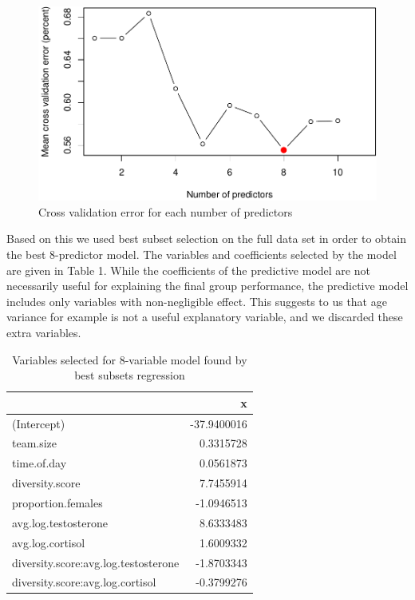 \documentclass[]{article}
\begin{document}
\begin{figure}
\centering
\includegraphics{19_10_27_hw7_q1_files/figure-latex/cv-1.pdf}
\caption{\label{fig:cv} Cross validation error for each number of
predictors}
\end{figure}

Based on this we used best subset selection on the full data set in
order to obtain the best 8-predictor model. The variables and
coefficients selected by the model are given in Table 1. While the
coefficients of the predictive model are not necessarily useful for
explaining the final group performance, the predictive model includes
only variables with non-negligible effect. This suggests to us that age
variance for example is not a useful explanatory variable, and we
discarded these extra variables.

\begin{table}

\caption{\label{tab:unnamed-chunk-2}Variables selected for 8-variable model found by best subsets regression}
\centering
\begin{tabular}[t]{l|r}
\hline
  & x\\
\hline
(Intercept) & -37.9400016\\
\hline
team.size & 0.3315728\\
\hline
time.of.day & 0.0561873\\
\hline
diversity.score & 7.7455914\\
\hline
proportion.females & -1.0946513\\
\hline
avg.log.testosterone & 8.6333483\\
\hline
avg.log.cortisol & 1.6009332\\
\hline
diversity.score:avg.log.testosterone & -1.8703343\\
\hline
diversity.score:avg.log.cortisol & -0.3799276\\
\hline
\end{tabular}
\end{table}
\end{document}

